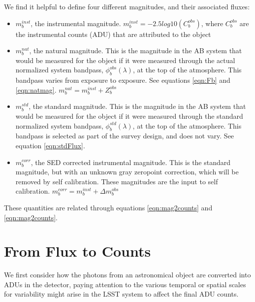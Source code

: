\documentclass[12pt,preprint]{aastex}
\begin{document}
\begin{boxedminipage}{7in}
We find it helpful to define four different magnitudes, and their associated fluxes:
\begin{itemize}
\item{$m_b^{inst}$, the instrumental magnitude.  $m_b^{inst} = -2.5 log10(C_b^{obs})$, where $C_b^{obs}$ are the instrumental counts (ADU) that are attributed to the object}
\item{$m_b^{nat}$, the natural magnitude.  This is the magnitude in the AB system that would be measured for the object if it were measured through the actual normalized system bandpass, $\phi_b^{obs}(\lambda)$, at the top of the atmosphere.  This bandpass varies
from exposure to exposure.  See equations \ref{eqn:Fb} and \ref{eqn:natmag}. $m_b^{nat} = m_b^{inst} + Z_b^{obs}$}
\item{$m_b^{std}$}, the standard magnitude.  This is the magnitude in the AB system that would be measured for the object if it were measured through the standard normalized system bandpass, $\phi_b^{std}(\lambda)$, at the top of the atmosphere.  This bandpass is 
selected as part of the survey design, and does not vary.  See equation \ref{eqn:stdFlux}. 
\item{$m_b^{corr}$, the SED corrected instrumental magnitude.  This is the standard magnitude, but with an unknown gray zeropoint correction, which will be removed by self calibration.  These magnitudes are the input to self calibration. $m_b^{corr} = m_b^{inst} + \Delta m_b^{obs}$}
\end{itemize}
These quantities are related through equations \ref{eqn:mag2counts} and \ref{eqn:mag2counts}.
\end{boxedminipage}

\section{From Flux to Counts}

We first consider how the photons from an astronomical object are
converted into ADUs in the detector, paying attention to the various
temporal or spatial scales for variability might arise in the LSST
system to affect the final ADU counts. 
\end{document}
